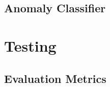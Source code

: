 \lipsum


\subsection{Anomaly Classifier}
\label{subsec:classifier-implementation}

\lipsum


\section{Testing}
\label{sec:testing}

\lipsum[1-15]


\subsection{Evaluation Metrics}
\label{subsec:evaluation-metrics}

\lipsum
